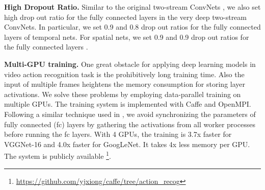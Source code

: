 \documentclass[10pt,twocolumn,letterpaper]{article}
\begin{document}
\textbf{High Dropout Ratio.} Similar to the original two-stream ConvNets \cite{SimonyanZ14}, we also set high drop out ratio for the fully connected layers in the very deep two-stream ConvNets. In particular, we set 0.9 and 0.8 drop out ratios for the fully connected layers of temporal nets. For spatial nets, we set 0.9 and 0.9 drop out ratios for the fully connected layers .

\textbf{Multi-GPU training.}  One great obstacle for applying deep learning models in video action recognition task is the prohibitively long training time. Also the input of multiple frames heightens the memory consumption for storing layer activations. We solve these problems by employing data-parallel training on multiple GPUs. The training system is implemented with Caffe \cite{JiaSDKLGGD14} and OpenMPI. Following a similar technique used in \cite{HeArxiv2015}, we avoid synchronizing the parameters of fully connected (fc) layers by gathering the activations from all worker processes before running the fc layers. With 4 GPUs, the training is 3.7x faster for VGGNet-16 and 4.0x faster for GoogLeNet. It takes 4x less memory per GPU. The system is publicly available \footnote{\url{https://github.com/yjxiong/caffe/tree/action_recog}}.

\begin{table*}
\begin{center}
\vspace{2mm}
\caption{Performance comparison of different architectures on the UCF101 dataset. ({\bf with} using our proposed good practices)}
\label{tbl:result_ucf}
\end{center}
\end{table*}
\end{document}
